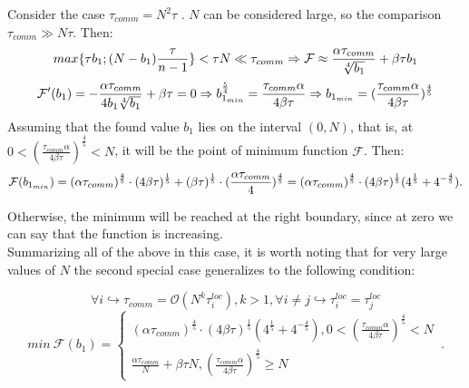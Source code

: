 \documentclass{article}
\begin{document}
Consider the case $\tau_{comm} = N^2 \tau$ . $N$ can be considered large, so the comparison $\tau_{comm} \gg N\tau$. Then:
\begin{equation}
    \notag
     max \{\tau b_1; (N-b_1)\frac{\tau}{n-1}\} < \tau N \ll \tau_{comm}\Rightarrow \mathcal{F} \approx \frac{\alpha \tau_{comm}}{\sqrt[4]{b_1}} + \beta \tau b_1 
\end{equation}
\begin{equation}
    \notag
    \mathcal{F}' (b_1) = -\frac{\alpha \tau_{comm}}{4b_1\sqrt[4]{b_1}} + \beta \tau = 0 \Rightarrow b_{1_{min}}^\frac{5}{4} = \frac{\tau _{comm}\alpha}{4\beta\tau}\Rightarrow b_{1_{min}} = (\frac{\tau _{comm}\alpha}{4\beta\tau})^{\frac{4}{5}}
\end{equation}
Assuming that the found value $b_1$ lies on the interval $(0, N) $, that is, at $0 < (\frac{\tau _{comm}\alpha}{4\beta\tau})^{\frac{4}{5}} < N$, it will be the point of minimum function $\mathcal{F}$. Then:
\begin{equation}
    \notag
    \mathcal{F}(b_{1_{min}}) = (\alpha \tau_{comm})^\frac{4}{5} \cdot (4\beta\tau)^\frac{1}{5} + (\beta \tau)^\frac{1}{5}\cdot(\frac{\alpha \tau_{comm}}{4})^\frac{4}{5} = (\alpha \tau_{comm})^\frac{4}{5}\cdot (4\beta\tau)^\frac{1}{5}(4^\frac{1}{5} + 4^{-\frac{4}{5}}).
\end{equation}
    
Otherwise, the minimum will be reached at the right boundary, since at zero we can say that the function is increasing.
    \\
Summarizing all of the above in this case, it is worth noting that for very large values of $N$ the second special case generalizes to the following condition:

\begin {equation} 
    \forall i  \hookrightarrow \tau_{comm} = \mathcal{O}( N^k \tau_i^{loc}), k >1 , \forall i\neq j\hookrightarrow \tau_i^{loc} = \tau_j^{loc}
\end {equation}
\begin {equation}          
min ~ {\mathcal{F}}(b_1) = \begin{cases}
      (\alpha \tau_{comm})^\frac{4}{5}\cdot (4\beta\tau)^\frac{1}{5}(4^\frac{1}{5} + 4^{-\frac{4}{5}}),  0 < (\frac{\tau _{comm}\alpha}{4\beta\tau})^{\frac{4}{5}} < N\\
      \frac{\alpha\tau _{comm}}{N} + \beta \tau N , (\frac{\tau _{comm}\alpha}{4\beta\tau})^{\frac{4}{5}} \geq N
    \end{cases}\,.
\end {equation}
\end{document}
